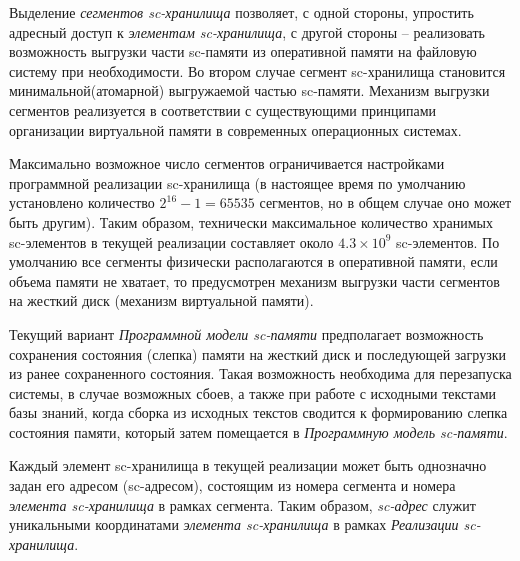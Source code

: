 \begin{SCn}
\begin{scnindent}
\end{scnindent}
\end{SCn}

Выделение \textit{сегментов sc-хранилища} позволяет, с одной стороны, упростить адресный доступ к \textit{элементам
sc-хранилища}, с другой стороны -- реализовать возможность выгрузки части sc-памяти из оперативной памяти на файловую
систему при необходимости. Во втором случае сегмент sc-хранилища становится минимальной(атомарной) выгружаемой частью
sc-памяти. Механизм выгрузки сегментов реализуется в соответствии с существующими принципами организации виртуальной
памяти в современных операционных системах.

Максимально возможное число сегментов ограничивается настройками программной реализации sc-хранилища (в настоящее время
по умолчанию установлено количество $2^{16}-1=65535$ сегментов, но в общем случае оно может быть другим). Таким
образом, технически максимальное количество хранимых sc-элементов в текущей реализации составляет около $4.3 \times
10^{9}$
sc-элементов. По умолчанию все сегменты физически располагаются в оперативной памяти, если объема памяти не хватает,
то предусмотрен механизм выгрузки части сегментов на жесткий диск (механизм виртуальной памяти).

Текущий вариант \textit{Программной модели sc-памяти} предполагает возможность сохранения состояния (слепка) памяти
на жесткий диск и последующей загрузки из ранее сохраненного состояния. Такая возможность необходима для перезапуска
системы, в случае возможных сбоев, а также при работе с исходными текстами базы знаний, когда сборка из исходных текстов
сводится к формированию слепка состояния памяти, который затем помещается в \textit{Программную модель sc-памяти}.

Каждый элемент sc-хранилища в текущей реализации может быть однозначно задан его адресом (sc-адресом), состоящим из
номера сегмента и номера \textit{элемента sc-хранилища} в рамках сегмента. Таким образом, \textit{sc-адрес} служит
уникальными координатами \textit{элемента sc-хранилища} в рамках \textit{Реализации sc-хранилища}.

